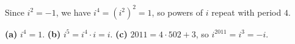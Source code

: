 Since $i^2=-1$, we have $i^4=\left(i^2\right)^2=1$, so powers of $i$ repeat with period $4$.

\textbf{(a)} $i^4=\boxed{1}$. \quad \textbf{(b)} $i^5=i^4\cdot i=\boxed{i}$. \quad \textbf{(c)} $2011=4\cdot502+3$, so $i^{2011}=i^3=\boxed{-i}$.
